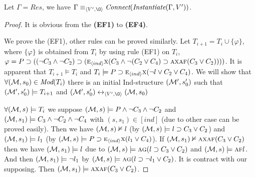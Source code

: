 \documentclass{article}
\begin{document}
\begin{proposition} \label{pro:EF}
Let $\Gamma=Res$, we have $\Gamma \equiv_{\tuple{V', {\O}}}\emph{Connect}(\emph{Instantiate}(\Gamma, V'))$.
\end{proposition}
\begin{proof}
It is obvious from the  \textbf{(EF1)} to \textbf{(EF4)}.

We prove the (EF1), other rules can be proved similarly.
Let $T_{i+1}=T_i \cup \{\varphi\}$, where $\{\varphi\}$ is obtained from $T_i$ by using rule (EF1) on $T_i$, \ie $\varphi =P \supset ((\neg C_3 \wedge \neg C_2) \supset  (\textsc{e}_{{\langle{ind}\rangle}}\textsc{x}(C_3 \wedge \neg (C_2 \vee C_4) \supset \textsc{a}\textsc{x} \textsc{a}\textsc{f}(C_3 \vee C_2))))$.
It is apparent that $T_{i+1} \models T_i$ and $T_i \models P\supset \textsc{e}_{{\langle{ind}\rangle}}\textsc{x} (\neg l \vee C_2 \vee C_4)$.
We will show that $\forall ({\cal M}, s_0) \in \textit{Mod}(T_i)$ there is an initial Ind-structure $({\cal M}',s_0')$ such that $({\cal M}',s_0') \models T_{i+1}$ and $(\Hm',s_0') \lrto_{\tuple{V', {\O}}} (\Hm, s_0)$

$\forall ({\cal M}, s) \models T_i$ we suppose $({\cal M}, s) \models P \wedge \neg C_3 \wedge \neg C_2$ and $({\cal M}, s_1)\models C_3 \wedge \neg C_2 \wedge \neg C_4$ with $(s, s_1) \in [ind]$ (due to other case can be proved easily).
Then we have $({\cal M}, s) \nvDash l$ (by $({\cal M}, s) \models l \supset C_3 \vee C_2$) and $({\cal M},s_1) \models l_1$ (by $({\cal M}, s) \models P\supset \textsc{e}_{{\langle{ind}\rangle}}\textsc{x} (l_1 \vee C_4)$).
If $({\cal M},s_1) \nvDash \textsc{a}\textsc{x} \textsc{a}\textsc{f}(C_3 \vee C_2)$ then we have $({\cal M}, s_1) \models l$ due to $({\cal M}, s) \models \textsc{a}\textsc{g}(l\supset C_3 \vee C_2)$ and $({\cal M}, s)\models \textsc{a}\textsc{f} l$.
And then $({\cal M}, s_1) \models \neg l_1$ by $({\cal M},s) \models \textsc{a} \textsc{g}(l\supset \neg l_1 \vee C_2)$.
It is contract with our supposing.
Then $({\cal M},s_1) \models \textsc{a}\textsc{x} \textsc{a}\textsc{f}(C_3 \vee C_2)$.


\end{proof}
\end{document}
